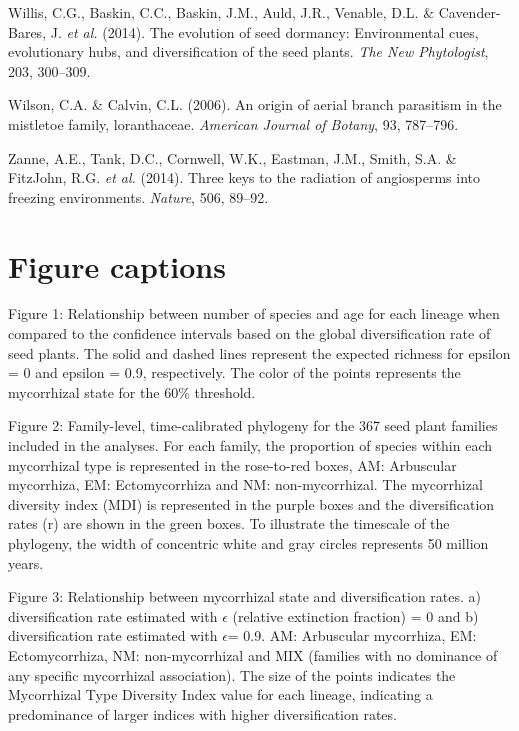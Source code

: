 \documentclass[12pt,]{article}
\begin{document}
\leavevmode\hypertarget{ref-willis_2014}{}%
Willis, C.G., Baskin, C.C., Baskin, J.M., Auld, J.R., Venable, D.L. \&
Cavender-Bares, J. \emph{et al.} (2014). The evolution of seed dormancy:
Environmental cues, evolutionary hubs, and diversification of the seed
plants. \emph{The New Phytologist}, 203, 300--309.

\leavevmode\hypertarget{ref-wilson_2006}{}%
Wilson, C.A. \& Calvin, C.L. (2006). An origin of aerial branch
parasitism in the mistletoe family, loranthaceae. \emph{American Journal
of Botany}, 93, 787--796.

\leavevmode\hypertarget{ref-zanne_2014}{}%
Zanne, A.E., Tank, D.C., Cornwell, W.K., Eastman, J.M., Smith, S.A. \&
FitzJohn, R.G. \emph{et al.} (2014). Three keys to the radiation of
angiosperms into freezing environments. \emph{Nature}, 506, 89--92.

\newpage

\hypertarget{figure-captions}{%
\section{Figure captions}\label{figure-captions}}

Figure 1: Relationship between number of species and age for each
lineage when compared to the confidence intervals based on the global
diversification rate of seed plants. The solid and dashed lines
represent the expected richness for epsilon = 0 and epsilon = 0.9,
respectively. The color of the points represents the mycorrhizal state
for the 60\% threshold.

Figure 2: Family-level, time-calibrated phylogeny for the 367 seed plant
families included in the analyses. For each family, the proportion of
species within each mycorrhizal type is represented in the rose-to-red
boxes, AM: Arbuscular mycorrhiza, EM: Ectomycorrhiza and NM:
non-mycorrhizal. The mycorrhizal diversity index (MDI) is represented in
the purple boxes and the diversification rates (r) are shown in the
green boxes. To illustrate the timescale of the phylogeny, the width of
concentric white and gray circles represents 50 million years.

Figure 3: Relationship between mycorrhizal state and diversification
rates. a) diversification rate estimated with \(\epsilon\) (relative
extinction fraction) = 0 and b) diversification rate estimated with
\(\epsilon\)= 0.9. AM: Arbuscular mycorrhiza, EM: Ectomycorrhiza, NM:
non-mycorrhizal and MIX (families with no dominance of any specific
mycorrhizal association). The size of the points indicates the
Mycorrhizal Type Diversity Index value for each lineage, indicating a
predominance of larger indices with higher diversification rates.
\end{document}
